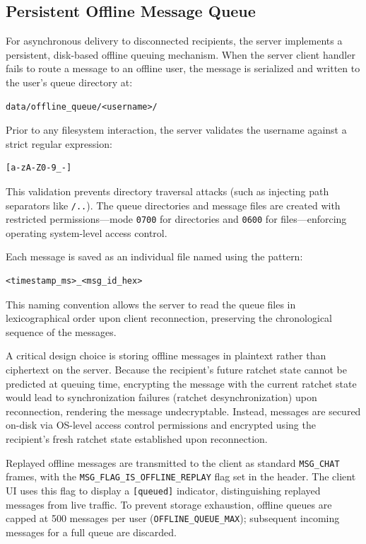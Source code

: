 \documentclass[conference]{IEEEtran}
\begin{document}
\subsection{Persistent Offline Message Queue}

For asynchronous delivery to disconnected recipients, the server implements a persistent, disk-based offline queuing mechanism. When the server client handler fails to route a message to an offline user, the message is serialized and written to the user's queue directory at:
\begin{verbatim}
data/offline_queue/<username>/
\end{verbatim}

Prior to any filesystem interaction, the server validates the username against a strict regular expression:
\begin{verbatim}
[a-zA-Z0-9_-]
\end{verbatim}
This validation prevents directory traversal attacks (such as injecting path separators like \texttt{/..}). The queue directories and message files are created with restricted permissions—mode \texttt{0700} for directories and \texttt{0600} for files—enforcing operating system-level access control.

Each message is saved as an individual file named using the pattern:
\begin{verbatim}
<timestamp_ms>_<msg_id_hex>
\end{verbatim}
This naming convention allows the server to read the queue files in lexicographical order upon client reconnection, preserving the chronological sequence of the messages.

A critical design choice is storing offline messages in plaintext rather than ciphertext on the server. Because the recipient's future ratchet state cannot be predicted at queuing time, encrypting the message with the current ratchet state would lead to synchronization failures (ratchet desynchronization) upon reconnection, rendering the message undecryptable. Instead, messages are secured on-disk via OS-level access control permissions and encrypted using the recipient's fresh ratchet state established upon reconnection.

Replayed offline messages are transmitted to the client as standard \texttt{MSG\_CHAT} frames, with the \texttt{MSG\_FLAG\_IS\_OFFLINE\_REPLAY} flag set in the header. The client UI uses this flag to display a \texttt{[queued]} indicator, distinguishing replayed messages from live traffic. To prevent storage exhaustion, offline queues are capped at 500 messages per user (\texttt{OFFLINE\_QUEUE\_MAX}); subsequent incoming messages for a full queue are discarded.
\end{document}
